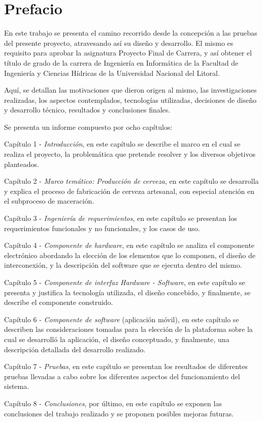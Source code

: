\chapter{Prefacio}
\par
En este trabajo se presenta el camino recorrido desde la concepción a las pruebas del presente proyecto, atravesando así su diseño y desarrollo. El mismo es requisito para aprobar la asignatura Proyecto Final de Carrera, y así obtener el título de grado de la carrera de Ingeniería en Informática de la Facultad de Ingeniería y Ciencias Hídricas de la Universidad Nacional del Litoral.
\par
Aquí, se detallan las motivaciones que dieron origen al mismo, las investigaciones realizadas, los aspectos contemplados, tecnologías utilizadas, decisiones de diseño y desarrollo técnico, resultados y conclusiones finales.
\par
Se presenta un informe compuesto por ocho capítulos:
\par
Capítulo 1 - \textit{Introducción}, en este capítulo se describe el marco en el cual se realiza el proyecto, la problemática que pretende resolver y los diversos objetivos planteados.
\par
Capítulo 2 - \textit{Marco temático: Producción de cerveza}, en este capítulo se desarrolla y explica el proceso de fabricación de cerveza artesanal, con especial atención en el subproceso de maceración.
\par
Capítulo 3 - \textit{Ingeniería de requerimientos}, en este capítulo se presentan los requerimientos funcionales y no funcionales, y los casos de uso.
\par
Capítulo 4 - \textit{Componente de hardware}, en este capítulo se analiza el componente electrónico abordando la elección de los elementos que lo componen, el diseño de interconexión, y la descripción del software que se ejecuta dentro del mismo.
\par
Capítulo 5 - \textit{Componente de interfaz Hardware - Software}, en este capítulo se presenta y justifica la tecnología utilizada, el diseño concebido, y finalmente, se describe el componente construido.
\par
Capítulo 6 - \textit{Componente de software} (aplicación móvil), en este capítulo se describen las consideraciones tomadas para la elección de la plataforma sobre la cual se desarrolló la aplicación, el diseño conceptuado, y finalmente, una descripción detallada del desarrollo realizado.
\par
Capítulo 7 - \textit{Pruebas}, en este capítulo se presentan los resultados de diferentes pruebas llevadas a cabo sobre los diferentes aspectos del funcionamiento del sistema.
\par
Capítulo 8 - \textit{Conclusiones}, por último, en este capítulo se exponen las conclusiones del trabajo realizado y se proponen posibles mejoras futuras.
